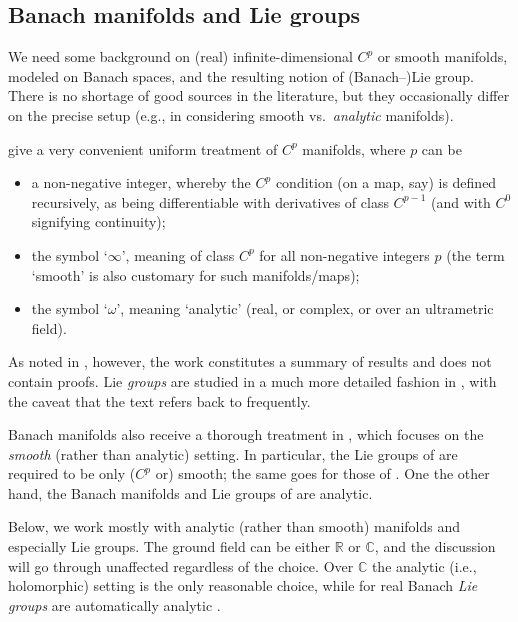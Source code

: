 \documentclass[10pt,a4paper]{amsart}
\numberwithin{equation}{section}
\newcommand\bC{{\mathbb C}}
\newcommand\bR{{\mathbb R}}
\begin{document}
\subsection{Banach manifolds and Lie groups}\label{subse:banmf}

We need some background on (real) infinite-dimensional $C^p$ or smooth manifolds, modeled on Banach spaces, and the resulting notion of (Banach--)Lie group. There is no shortage of good sources in the literature, but they occasionally differ on the precise setup (e.g., in considering smooth vs.\ {\it analytic} manifolds).

\cite{bourb-vars-17,bourb-vars-8-15} give a very convenient uniform treatment of $C^p$ manifolds, where $p$ can be
\begin{itemize}\itemsep=0pt
\item a non-negative integer, whereby the $C^p$ condition (on a map, say) is defined recursively, as being differentiable with derivatives of class $C^{p-1}$ (and with $C^0$ signifying continuity);

\item the symbol `$\infty$', meaning of class $C^p$ for all non-negative integers $p$ (the term `smooth' is also customary for such manifolds/maps);

\item the symbol `$\omega$', meaning `analytic' (real, or complex, or over an ultrametric field).
\end{itemize}
As noted in \cite[Avertissement]{bourb-vars-17}, however, the work constitutes a summary of results and does not contain proofs. Lie {\it groups} are studied in a much more detailed fashion in \cite[Chapter III]{bourb-lie-13}, with the caveat that the text refers back to \cite{bourb-vars-17,bourb-vars-8-15} frequently.

Banach manifolds also receive a thorough treatment in \cite{lang-fund}, which focuses on the {\it smooth} (rather than analytic) setting. In particular, the Lie groups of \cite[Section~VI.5]{lang-fund} are required to be only ($C^p$ or) smooth; the same goes for those of \cite[Definition IV.1]{neeb-inf}. One the other hand, the Banach manifolds \cite[Section~3]{upm-ban} and Lie groups of \cite[Section~6]{upm-ban} are analytic.

Below, we work mostly with analytic (rather than smooth) manifolds and especially Lie groups. The ground field can be either $\bR$ or $\bC$, and the discussion will go through unaffected regardless of the choice. Over $\bC$ the analytic (i.e., holomorphic) setting is the only reasonable choice, while for real Banach {\it Lie groups} are automatically analytic \cite[Corollary IV.1.10]{neeb-lc}.
\end{document}
